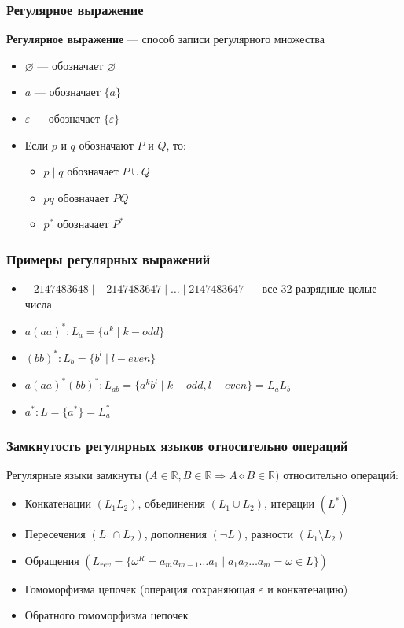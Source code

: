 \documentclass{beamer}
\begin{document}
\begin{frame}[fragile]
  \transwipe[direction=90]
  \frametitle{Регулярное выражение}
    \textbf{Регулярное выражение} --- способ записи регулярного множества


    \begin{itemize}
      \item $\varnothing $ --- обозначает $\varnothing$
      \item $a$  --- обозначает $\{a\}$ 
      \item $\varepsilon$  --- обозначает $\{\varepsilon\}$ 
      \item Если $p$ и $q$ обозначают $P$ и $Q$, то:
      \begin{itemize}
        \item $p \mid q$ обозначает $P \cup Q$ 
        \item $pq$ обозначает $PQ$
        \item $p^*$ обозначает $P^*$
      \end{itemize}
    \end{itemize}
\end{frame}

\begin{frame}[fragile]
  \transwipe[direction=90]
  \frametitle{Примеры регулярных выражений}
  \begin{itemize}
    \item $-2 147 483 648 \mid -2 147 483 647 \mid \dots \mid  2 147 483 647$ --- все 32-разрядные целые числа
    \item $a(aa)^*: L_a = \{a^k \mid k - odd \} $
    \item $(bb)^*: L_b = \{b^l \mid l - even \} $
    \item $a(aa)^* (bb)^* :  L_{ab} = \{a^k b^l \mid k - odd, l - even\} =  L_a L_b$   
    \item $a^* : L = \{a^*\} = L_a^*$
  \end{itemize}
\end{frame}


\begin{frame}[fragile]
  \transwipe[direction=90]
  \frametitle{Замкнутость регулярных языков относительно операций}
  Регулярные языки замкнуты ($A \in \mathbb{R}, B \in \mathbb{R} \Rightarrow A \diamond B \in \mathbb{R}$) относительно операций: 
  \begin{itemize}
    \item Конкатенации $ (L_1 L_2) $, объединения $ (L_1 \cup L_2) $, итерации $ (L^*) $
    \item Пересечения $ (L_1 \cap L_2) $, дополнения $ (\neg L)$, разности $ (L_1 \setminus L_2) $
    \item Обращения $(L_{rev} = \{\omega^R = a_m a_{m-1} \dots a_1 \mid a_1 a_2 \dots a_m = \omega \in L \})$
    \item Гомоморфизма цепочек (операция сохраняющая $\varepsilon$ и конкатенацию)
    \item Обратного гомоморфизма цепочек
  \end{itemize}
\end{frame}
\end{document}
